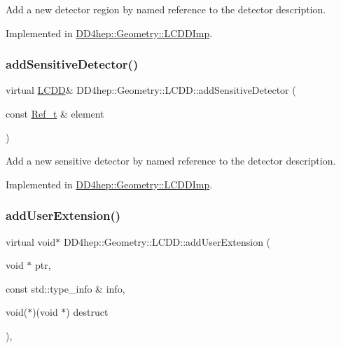 Add a new detector region by named reference to the detector description. 



Implemented in \hyperlink{class_d_d4hep_1_1_geometry_1_1_l_c_d_d_imp_a9b24c9ac8dde50f36fbeea3e6cb8d2cb}{D\+D4hep\+::\+Geometry\+::\+L\+C\+D\+D\+Imp}.

\hypertarget{class_d_d4hep_1_1_geometry_1_1_l_c_d_d_aa574186ef096f626835ea6f389769230}{}\label{class_d_d4hep_1_1_geometry_1_1_l_c_d_d_aa574186ef096f626835ea6f389769230} 
\subsubsection{\texorpdfstring{add\+Sensitive\+Detector()}{addSensitiveDetector()}}
{\footnotesize\ttfamily virtual \hyperlink{class_d_d4hep_1_1_geometry_1_1_l_c_d_d}{L\+C\+DD}\& D\+D4hep\+::\+Geometry\+::\+L\+C\+D\+D\+::add\+Sensitive\+Detector (\begin{DoxyParamCaption}\item[{const \hyperlink{group___d_d4_h_e_p___g_e_o_m_e_t_r_y_ga40af83be6718bb8828a3d83dc7f8c930}{Ref\+\_\+t} \&}]{element }\end{DoxyParamCaption})\hspace{0.3cm}{\ttfamily [pure virtual]}}



Add a new sensitive detector by named reference to the detector description. 



Implemented in \hyperlink{class_d_d4hep_1_1_geometry_1_1_l_c_d_d_imp_a5509dc3840aa73a8c5d5e8f886f3be3f}{D\+D4hep\+::\+Geometry\+::\+L\+C\+D\+D\+Imp}.

\hypertarget{class_d_d4hep_1_1_geometry_1_1_l_c_d_d_ae4fdea118902519ae7581fe0bd733559}{}\label{class_d_d4hep_1_1_geometry_1_1_l_c_d_d_ae4fdea118902519ae7581fe0bd733559} 
\subsubsection{\texorpdfstring{add\+User\+Extension()}{addUserExtension()}}
{\footnotesize\ttfamily virtual void$\ast$ D\+D4hep\+::\+Geometry\+::\+L\+C\+D\+D\+::add\+User\+Extension (\begin{DoxyParamCaption}\item[{void $\ast$}]{ptr,  }\item[{const std\+::type\+\_\+info \&}]{info,  }\item[{void($\ast$)(void $\ast$)}]{destruct }\end{DoxyParamCaption})\hspace{0.3cm}{\ttfamily [protected]}, {}}



